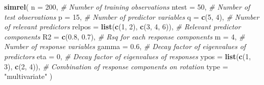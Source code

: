 \documentclass[review]{elsarticle}
\newenvironment{Shaded}{\begin{snugshade}}{\end{snugshade}}
\newcommand{\KeywordTok}[1]{\textcolor[rgb]{0.13,0.29,0.53}{\textbf{#1}}}
\newcommand{\DataTypeTok}[1]{\textcolor[rgb]{0.13,0.29,0.53}{#1}}
\newcommand{\DecValTok}[1]{\textcolor[rgb]{0.00,0.00,0.81}{#1}}
\newcommand{\FloatTok}[1]{\textcolor[rgb]{0.00,0.00,0.81}{#1}}
\newcommand{\StringTok}[1]{\textcolor[rgb]{0.31,0.60,0.02}{#1}}
\newcommand{\CommentTok}[1]{\textcolor[rgb]{0.56,0.35,0.01}{\textit{#1}}}
\newcommand{\NormalTok}[1]{#1}
\theoremstyle{definition}
\theoremstyle{definition}
\theoremstyle{definition}
\theoremstyle{remark}
\begin{document}
\begin{Shaded}
\begin{Highlighting}[]
\KeywordTok{simrel}\NormalTok{(}
  \DataTypeTok{n      =} \DecValTok{200}\NormalTok{, }\CommentTok{# Number of training observations}
  \DataTypeTok{ntest  =} \DecValTok{50}\NormalTok{, }\CommentTok{# Number of test observations}
  \DataTypeTok{p      =} \DecValTok{15}\NormalTok{, }\CommentTok{# Number of predictor variables}
  \DataTypeTok{q      =} \KeywordTok{c}\NormalTok{(}\DecValTok{5}\NormalTok{, }\DecValTok{4}\NormalTok{), }\CommentTok{# Number of relevant predictors}
  \DataTypeTok{relpos =} \KeywordTok{list}\NormalTok{(}\KeywordTok{c}\NormalTok{(}\DecValTok{1}\NormalTok{, }\DecValTok{2}\NormalTok{), }\KeywordTok{c}\NormalTok{(}\DecValTok{3}\NormalTok{, }\DecValTok{4}\NormalTok{, }\DecValTok{6}\NormalTok{)),}
         \CommentTok{# Relevant predictor components}
  \DataTypeTok{R2     =} \KeywordTok{c}\NormalTok{(}\FloatTok{0.8}\NormalTok{, }\FloatTok{0.7}\NormalTok{), }\CommentTok{# Rsq for each response components}
  \DataTypeTok{m      =} \DecValTok{4}\NormalTok{, }\CommentTok{# Number of response variables}
  \DataTypeTok{gamma  =} \FloatTok{0.6}\NormalTok{, }\CommentTok{# Decay factor of eigenvalues of predictors}
  \DataTypeTok{eta    =} \DecValTok{0}\NormalTok{, }\CommentTok{# Decay factor of eigenvalues of responses}
  \DataTypeTok{ypos   =} \KeywordTok{list}\NormalTok{(}\KeywordTok{c}\NormalTok{(}\DecValTok{1}\NormalTok{, }\DecValTok{3}\NormalTok{), }\KeywordTok{c}\NormalTok{(}\DecValTok{2}\NormalTok{, }\DecValTok{4}\NormalTok{)),}
         \CommentTok{# Combination of response components on rotation}
  \DataTypeTok{type   =} \StringTok{"multivariate"}
\NormalTok{)}
\end{Highlighting}
\end{Shaded}
\end{document}
